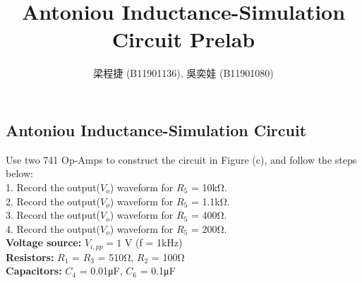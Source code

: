\documentclass{article}
\title{Antoniou Inductance-Simulation Circuit Prelab}
\author{梁程捷 (B11901136), 吳奕娃 (B11901080)}
\date{}
\begin{document}
\begin{CJK*}{UTF8}{bkai}

\maketitle

\section*{Antoniou Inductance-Simulation Circuit}
Use two 741 Op-Amps to construct the circuit in Figure (c), and follow the steps below: \\
1. Record the output($V_o$) waveform for $R_5$ = 10\unit{\kilo\ohm}. \\
2. Record the output($V_o$) waveform for $R_5$ = 1.1\unit{\kilo\ohm}. \\
3. Record the output($V_o$) waveform for $R_5$ = 400\unit{\ohm}. \\
4. Record the output($V_o$) waveform for $R_5$ = 200\unit{\ohm}. \vspace{3mm}\\
\textbf{Voltage source: } $V_{i,pp} = 1$ \unit{\volt} (f = 1\unit{\kilo\hertz}) \\
\textbf{Resistors: }$R_1$ = $R_3$ = 510\unit{\ohm}, $R_2$ = 100\unit{\ohm} \\
\textbf{Capacitors: }$C_4$ = 0.01\unit{\micro\farad}, $C_6$ = 0.1\unit{\micro\farad} \\


\end{CJK*}
\end{document}
